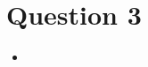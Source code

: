 \documentclass[12pt]{article}
\begin{document}





\section*{Question 3}

\begin{itemize}
    \item
\end{itemize}

\bigskip
\end{document}
